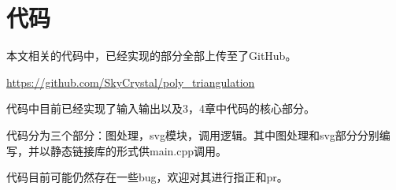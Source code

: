 
\appendix
\chapter{代码}
本文相关的代码中，已经实现的部分全部上传至了GitHub。

\url{https://github.com/SkyCrystal/poly_triangulation}

代码中目前已经实现了输入输出以及3，4章中代码的核心部分。

代码分为三个部分：图处理，svg模块，调用逻辑。其中图处理和svg部分分别编写，并以静态链接库的形式供main.cpp调用。

代码目前可能仍然存在一些bug，欢迎对其进行指正和pr。



